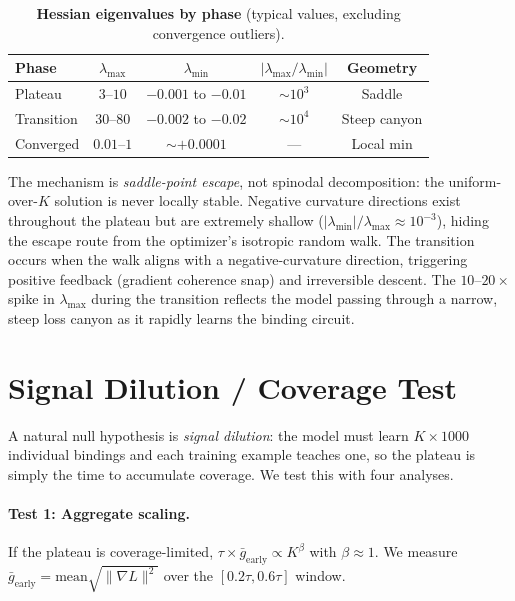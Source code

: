 \documentclass{article}
\begin{document}
\begin{table}[h]
\centering
\caption{\textbf{Hessian eigenvalues by phase} (typical values, excluding convergence outliers).}
\label{tab:hessian}
\vspace{4pt}
\small
\begin{tabular}{@{}lcccc@{}}
\toprule
Phase & $\lambda_\text{max}$ & $\lambda_\text{min}$ & $|\lambda_\text{max}/\lambda_\text{min}|$ & Geometry \\
\midrule
Plateau & $3$--$10$ & $-0.001$ to $-0.01$ & ${\sim}10^3$ & Saddle \\
Transition & $30$--$80$ & $-0.002$ to $-0.02$ & ${\sim}10^4$ & Steep canyon \\
Converged & $0.01$--$1$ & ${\sim}+0.0001$ & --- & Local min \\
\bottomrule
\end{tabular}
\end{table}

The mechanism is \emph{saddle-point escape}, not spinodal decomposition: the uniform-over-$K$ solution is never locally stable. Negative curvature directions exist throughout the plateau but are extremely shallow ($|\lambda_\text{min}|/\lambda_\text{max} \approx 10^{-3}$), hiding the escape route from the optimizer's isotropic random walk. The transition occurs when the walk aligns with a negative-curvature direction, triggering positive feedback (gradient coherence snap) and irreversible descent. The $10$--$20\times$ spike in $\lambda_\text{max}$ during the transition reflects the model passing through a narrow, steep loss canyon as it rapidly learns the binding circuit.

\section{Signal Dilution / Coverage Test}
\label{app:signal-dilution}

A natural null hypothesis is \emph{signal dilution}: the model must learn $K \times 1000$ individual bindings and each training example teaches one, so the plateau is simply the time to accumulate coverage. We test this with four analyses.

\paragraph{Test 1: Aggregate scaling.}
If the plateau is coverage-limited, $\tau \times \bar{g}_\text{early} \propto K^\beta$ with $\beta \approx 1$. We measure $\bar{g}_\text{early} = \text{mean}\sqrt{\|\nabla L\|^2}$ over the $[0.2\tau, 0.6\tau]$ window.
\end{document}
